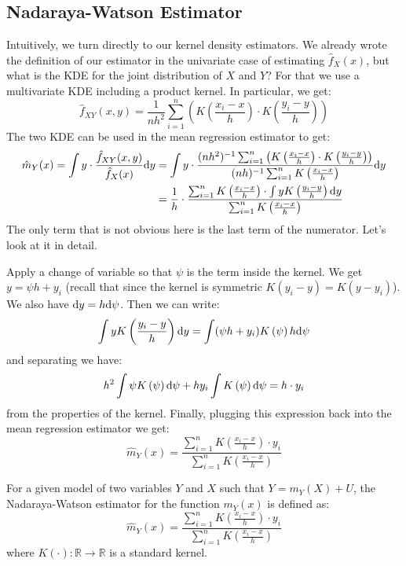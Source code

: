\subsection{Nadaraya-Watson Estimator}

Intuitively, we turn directly to our kernel density estimators. We already wrote the definition of our estimator in the univariate case of estimating $\hat f_X(x)$, but what is the KDE for the joint distribution of $X$ and $Y$? For that we use a multivariate KDE including a product kernel. In particular, we get: $$\hat f_{XY}(x, y) = \frac{1}{nh^2} \sum_{i=1}^{n} \left( K\left(\frac{x_i - x}{h}\right)\cdot K\left(\frac{y_i - y}{h}\right)\right) $$ The two KDE can be used in the mean regression estimator to get: \begin{align*}
\hat m_Y(x) = \int y\cdot \frac{\hat f_{XY}(x, y)}{\hat f_X(x)}\mathrm{d} y & = \int y\cdot \frac{(nh^2)^{-1} \sum_{i=1}^{n} \left( K\left(\frac{x_i - x}{h}\right)\cdot K\left(\frac{y_i - y}{h}\right)\right)}{(nh)^{-1} \sum_{i=1}^{n} K\left(\frac{x_i - x}{h}\right)} \mathrm{d} y \\
& = \frac{1}{h}\cdot \frac{\sum_{i=1}^{n} K\left(\frac{x_i - x}{h}\right)\cdot \int y K\left(\frac{y_i - y}{h}\right)\mathrm{d} y }{\sum_{i=1}^{n} K\left(\frac{x_i - x}{h}\right)}  
\end{align*} The only term that is not obvious here is the last term of the numerator. Let's look at it in detail.

Apply a change of variable so that $\psi$ is the term inside the kernel. We get $y = \psi h + y_i$ (recall that since the kernel is symmetric $K(y_i - y) = K(y - y_i)$). We also have $\mathrm{d} y = h\mathrm{d} \psi$. Then we can write: $$ \int y K\left(\frac{y_i - y}{h}\right)\mathrm{d} y = \int (\psi h + y_i) K\left(\psi\right)h\mathrm{d} \psi $$ and separating we have: $$ h^2 \int \psi  K\left(\psi\right)\mathrm{d} \psi + h y_i \int K\left(\psi\right)\mathrm{d} \psi = h\cdot y_i $$ from the properties of the kernel. Finally, plugging this expression back into the mean regression estimator we get: $$ \hat m_Y(x) = \frac{\sum_{i=1}^{n} K\left(\frac{x_i - x}{h}\right)\cdot y_i }{\sum_{i=1}^{n} K\left(\frac{x_i - x}{h}\right)} $$

\begin{definition}
For a given model of two variables $Y$ and $X$ such that $Y = m_Y(X) + U $, the Nadaraya-Watson estimator for the function $m_Y(x)$ is defined as: $$ \hat m_Y(x) = \frac{\sum_{i=1}^{n} K\left(\frac{x_i - x}{h}\right)\cdot y_i }{\sum_{i=1}^{n} K\left(\frac{x_i - x}{h}\right)} $$ where $K(\cdot):\mathbb{R}\to\mathbb{R}$ is a standard kernel.
\end{definition}

